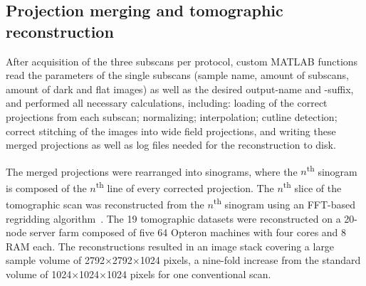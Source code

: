 \subsection{Projection merging and tomographic reconstruction}
After acquisition of the three subscans per protocol, custom MATLAB functions read the parameters of the single subscans (\eg sample name, amount of subscans, amount of dark and flat images) as well as the desired output-name and -suffix, and performed all necessary calculations, including: loading of the correct projections from each subscan; normalizing; interpolation; cutline detection; correct stitching of the images into wide field projections, and writing these merged projections as well as log files needed for the reconstruction to disk.

The merged projections were rearranged into sinograms, where the $n$\textsuperscript{th} sinogram is composed of the $n$\textsuperscript{th} line of every corrected projection. The $n$\textsuperscript{th} slice of the tomographic scan was reconstructed from the $n$\textsuperscript{th} sinogram using an FFT-based regridding algorithm~\cite{Dowd1999}. The 19 tomographic datasets were reconstructed on a 20-node server farm composed of five \SI{64}{\bit} Opteron machines with four cores and \SI{8}{\giga\byte} RAM each. The reconstructions resulted in an image stack covering a large sample volume of 2792$\times$2792$\times$1024 pixels, a nine-fold increase from the standard volume of 1024$\times$1024$\times$1024 pixels for one conventional scan.